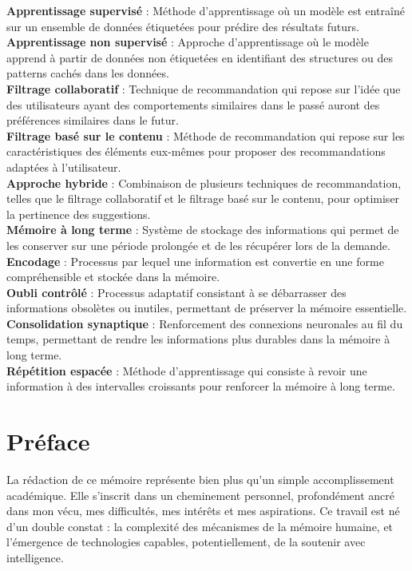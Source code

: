 \documentclass[11pt,a4paper]{report}
\begin{document}
\textbf{Apprentissage supervisé} : Méthode d’apprentissage où un modèle est entraîné sur un ensemble de données étiquetées pour prédire des résultats futurs.\\
\textbf{Apprentissage non supervisé} : Approche d’apprentissage où le modèle apprend à partir de données non étiquetées en identifiant des structures ou des patterns cachés dans les données.\\
\textbf{Filtrage collaboratif} : Technique de recommandation qui repose sur l'idée que des utilisateurs ayant des comportements similaires dans le passé auront des préférences similaires dans le futur.\\
\textbf{Filtrage basé sur le contenu} : Méthode de recommandation qui repose sur les caractéristiques des éléments eux-mêmes pour proposer des recommandations adaptées à l’utilisateur.\\
\textbf{Approche hybride} : Combinaison de plusieurs techniques de recommandation, telles que le filtrage collaboratif et le filtrage basé sur le contenu, pour optimiser la pertinence des suggestions.\\
\textbf{Mémoire à long terme} : Système de stockage des informations qui permet de les conserver sur une période prolongée et de les récupérer lors de la demande.\\
\textbf{Encodage} : Processus par lequel une information est convertie en une forme compréhensible et stockée dans la mémoire.\\
\textbf{Oubli contrôlé} : Processus adaptatif consistant à se débarrasser des informations obsolètes ou inutiles, permettant de préserver la mémoire essentielle.\\
\textbf{Consolidation synaptique} : Renforcement des connexions neuronales au fil du temps, permettant de rendre les informations plus durables dans la mémoire à long terme.\\
\textbf{Répétition espacée} : Méthode d’apprentissage qui consiste à revoir une information à des intervalles croissants pour renforcer la mémoire à long terme.\\

\chapter*{Préface}

La rédaction de ce mémoire représente bien plus qu’un simple accomplissement académique. Elle s’inscrit dans un cheminement personnel, profondément ancré dans mon vécu, mes difficultés, mes intérêts et mes aspirations. Ce travail est né d’un double constat : la complexité des mécanismes de la mémoire humaine, et l’émergence de technologies capables, potentiellement, de la soutenir avec intelligence.
\end{document}
